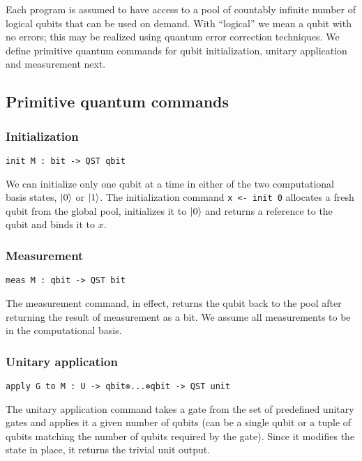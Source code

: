 \documentclass[adraft,creativecommons]{eptcs}
\theoremstyle{definition}
\theoremstyle{remark}
\begin{document}
Each program is assumed to have access to a pool of countably infinite number of logical qubits that can be used on demand. With ``logical'' we mean a qubit with no errors; this may be realized using quantum error correction techniques. We define primitive quantum commands for qubit initialization, unitary application and measurement next.

\subsection{Primitive quantum commands}

\subsubsection{Initialization}
\lstinline[language=QHaskell]{init M : bit -> QST qbit}\medskip

We can initialize only one qubit at a time in either of the two computational basis states, $\ket{0}$ or $\ket{1}$. The initialization command \lstinline[language=QHaskell]{x <- init 0} allocates a fresh qubit from the global pool, initializes it to $\ket{0}$ and returns a reference to the qubit and binds it to $x$.

\subsubsection{Measurement}

\lstinline[language=QHaskell]{meas M : qbit -> QST bit}\medskip

The measurement command, in effect, returns the qubit back to the pool after returning the result of measurement as a bit. We assume all measurements to be in the computational basis.

\subsubsection{Unitary application}

\lstinline[language=QHaskell]{apply G to M : U -> qbit⊗...⊗qbit -> QST unit}\medskip

The unitary application command takes a gate from the set of predefined unitary gates and applies it a given number of qubits (can be a single qubit or a tuple of qubits matching the number of qubits required by the gate). Since it modifies the state in place, it returns the trivial unit output.


\end{document}
